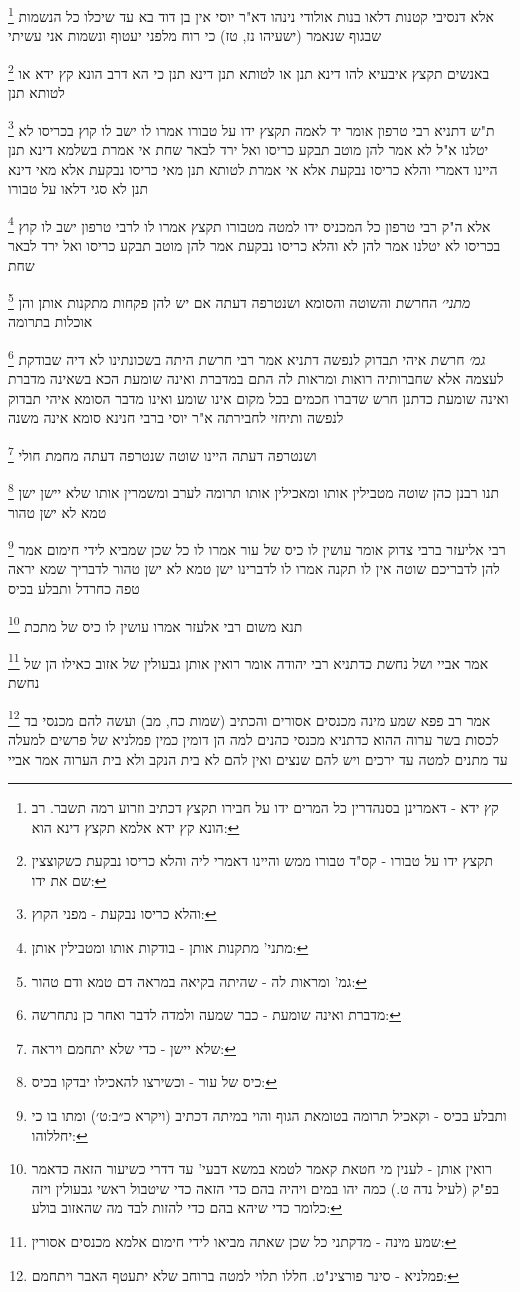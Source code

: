 \documentclass[12pt, openany]{book}
\newcommand{\footnotecomment}[1]{
	\renewcommand\thefootnote{}
	\footnote{#1}}
\newcommand{\commenta}[1]{\footnotecomment{#1}}
\begin{document}
{{\commenta{קץ ידא - דאמרינן בסנהדרין כל המרים ידו על חבירו תקצץ דכתיב וזרוע רמה תשבר. רב הונא קץ ידא אלמא תקצץ דינא הוא:}
אלא דנסיבי קטנות דלאו בנות אולודי נינהו דא"ר יוסי אין בן דוד בא עד שיכלו כל הנשמות שבגוף שנאמר (ישעיהו נז, טז) כי רוח מלפני יעטוף ונשמות אני עשיתי
\commenta{תקצץ ידו על טבורו - קס"ד טבורו ממש והיינו דאמרי ליה והלא כריסו נבקעת כשקוצצין שם את ידו:}
באנשים תקצץ איבעיא להו דינא תנן או לטותא תנן דינא תנן כי הא דרב הונא קץ ידא או לטותא תנן 
\commenta{והלא כריסו נבקעת - מפני הקוץ:}
ת"ש דתניא רבי טרפון אומר יד לאמה תקצץ ידו על טבורו אמרו לו ישב לו קוץ בכריסו לא יטלנו א"ל לא אמר להן מוטב תבקע כריסו ואל ירד לבאר שחת 
אי אמרת בשלמא דינא תנן היינו דאמרי והלא כריסו נבקעת אלא אי אמרת לטותא תנן מאי כריסו נבקעת אלא מאי דינא תנן לא סגי דלאו על טבורו 
\commenta{מתני' מתקנות אותן - בודקות אותו ומטבילין אותן:}
אלא ה"ק רבי טרפון כל המכניס ידו למטה מטבורו תקצץ אמרו לו לרבי טרפון ישב לו קוץ בכריסו לא יטלנו אמר להן לא והלא כריסו נבקעת אמר להן מוטב תבקע כריסו ואל ירד לבאר שחת
\commenta{גמ' ומראות לה - שהיתה בקיאה במראה דם טמא ודם טהור:}
{\large\emph{מתני׳}} החרשת והשוטה והסומא ושנטרפה דעתה אם יש להן פקחות מתקנות אותן והן אוכלות בתרומה
\commenta{מדברת ואינה שומעת - כבר שמעה ולמדה לדבר ואחר כן נתחרשה:}
{\large\emph{גמ׳}} חרשת איהי תבדוק לנפשה דתניא אמר רבי חרשת היתה בשכונתינו לא דיה שבודקת לעצמה אלא שחברותיה רואות ומראות לה 
התם במדברת ואינה שומעת הכא בשאינה מדברת ואינה שומעת כדתנן חרש שדברו חכמים בכל מקום אינו שומע ואינו מדבר
הסומא איהי תבדוק לנפשה ותיחזי לחבירתה א"ר יוסי ברבי חנינא סומא אינה משנה
\commenta{שלא יישן - כדי שלא יתחמם ויראה:}
ושנטרפה דעתה היינו שוטה שנטרפה דעתה מחמת חולי 
\commenta{כיס של עור - וכשירצו להאכילו יבדקו בכיס:}
תנו רבנן כהן שוטה מטבילין אותו ומאכילין אותו תרומה לערב ומשמרין אותו שלא יישן ישן טמא לא ישן טהור 
\commenta{ותבלע בכיס - וקאכיל תרומה בטומאת הגוף והוי במיתה דכתיב (ויקרא כ״ב:ט׳) ומתו בו כי יחללוהו:}
רבי אליעזר ברבי צדוק אומר עושין לו כיס של עור אמרו לו כל שכן שמביא לידי חימום אמר להן לדבריכם שוטה אין לו תקנה 
אמרו לו לדברינו ישן טמא לא ישן טהור לדבריך שמא יראה טפה כחרדל ותבלע בכיס 
\commenta{רואין אותן - לענין מי חטאת קאמר לטמא במשא דבעי' עד דדרי כשיעור הזאה כדאמר בפ"ק (לעיל נדה ט.) כמה יהו במים ויהיה בהם כדי הזאה כדי שיטבול ראשי גבעולין ויזה כלומר כדי שיהא בהם כדי להזות לבד מה שהאזוב בולע:}
תנא משום רבי אלעזר אמרו עושין לו כיס של מתכת 
\commenta{שמע מינה - מדקתני כל שכן שאתה מביאו לידי חימום אלמא מכנסים אסורין:}
אמר אביי ושל נחשת כדתניא רבי יהודה אומר רואין אותן גבעולין של אזוב כאילו הן של נחשת 
\commenta{פמלניא - סינר פורצינ"ט. חללו תלוי למטה ברוחב שלא יתעטף האבר ויתחמם:}
אמר רב פפא שמע מינה מכנסים אסורים והכתיב (שמות כח, מב) ועשה להם מכנסי בד לכסות בשר ערוה 
ההוא כדתניא מכנסי כהנים למה הן דומין כמין פמלניא של פרשים למעלה עד מתנים למטה עד ירכים ויש להם שנצים ואין להם לא בית הנקב ולא בית הערוה 
אמר אביי
\clearpage}

}
\end{document}
